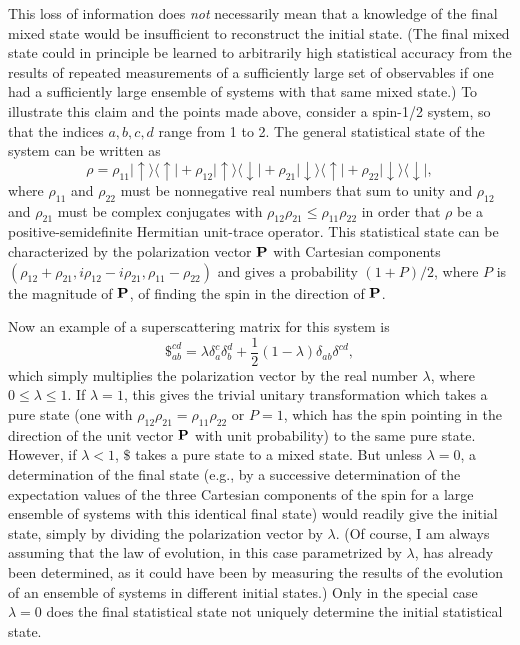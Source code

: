 \documentclass[12pt]{article}
\begin{document}
     This loss of information does {\it not} necessarily mean that a
knowledge
of the final mixed state would be insufficient to reconstruct the
initial
state.  (The final mixed state could in principle be learned to
arbitrarily
high statistical accuracy from the results of repeated measurements
of a
sufficiently large set of observables if one had a sufficiently large
ensemble
of systems with that same mixed state.)  To illustrate this claim and
the
points made above, consider a spin-1/2 system, so that the indices
${a,b,c,d}$
range from 1 to 2.  The general statistical state of the system can
be written
as
     	\begin{equation}
	\rho=\rho_{11}|\uparrow\rangle\langle\uparrow|
	+\rho_{12}|\uparrow\rangle\langle\downarrow|
	+\rho_{21}|\downarrow\rangle\langle\uparrow|
	+\rho_{22}|\downarrow\rangle\langle\downarrow|,
	\end{equation}
where $\rho_{11}$ and $\rho_{22}$ must be nonnegative real numbers
that sum to
unity and $\rho_{12}$ and $\rho_{21}$ must be complex conjugates with
$\rho_{12}\rho_{21} \leq \rho_{11}\rho_{22}$ in order that $\rho$ be
a
positive-semidefinite Hermitian unit-trace operator.  This
statistical state
can be characterized by the polarization vector ${\bf P}$ with
Cartesian
components
$(\rho_{12}+\rho_{21},i\rho_{12}-i\rho_{21},\rho_{11}-\rho_{22})$
and gives a probability $(1+P)/2$, where $P$ is the magnitude of
${\bf P}$, of
finding the spin in the direction of ${\bf P}$.

    Now an example of a superscattering matrix for this system is
     	\begin{equation}
	\$_{ab}^{cd} = \lambda\delta_a^c\delta_b^d +
\frac{1}{2}(1-\lambda)\delta_{ab}\delta^{cd},
	\end{equation}
 which simply multiplies the polarization vector by the real number
$\lambda$,
where $0\leq\lambda \leq 1$.  If $\lambda=1$, this gives the trivial
unitary
transformation which takes a pure state (one with $\rho_{12}\rho_{21}
=
\rho_{11}\rho_{22}$ or $P=1$, which has the spin pointing in the
direction of
the unit vector ${\bf P}$ with unit probability) to the same pure
state.
However, if $\lambda<1$, $\$$ takes a pure state to a mixed state.
But unless
$\lambda=0$, a determination of the final state (e.g., by a
successive
determination of the expectation values of the three Cartesian
components of
the spin for a large ensemble of systems with this identical final
state) would
readily give the initial state, simply by dividing the polarization
vector by
$\lambda$.  (Of course, I am always assuming that the law of
evolution, in this
case parametrized by $\lambda$, has already been determined, as it
could have
been by measuring the results of the evolution of an ensemble of
systems in
different initial states.)  Only in the special case $\lambda=0$ does
the final
statistical state not uniquely determine the initial statistical
state.
\end{document}

